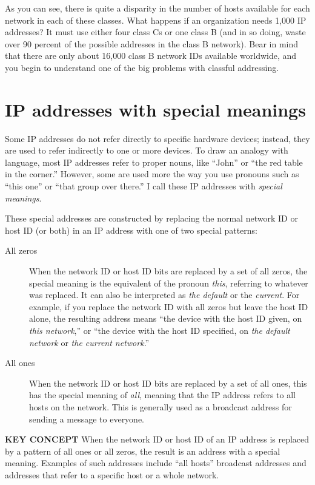As you can see, there is quite a disparity in the number of hosts
available for each network in each of these classes. What happens if an
organization needs 1,000
\protect\hypertarget{ch17s03.htmlux5cux23idx-CHP-17-0695}{}{}IP
addresses? It must use either four class Cs or one class B (and in so
doing, waste over 90 percent of the possible addresses in the class B
network). Bear in mind that there are only about 16,000 class B network
IDs available worldwide, and you begin to understand one of the big
problems with classful addressing.


\section{IP addresses with special meanings}

Some IP addresses do not refer directly to specific hardware devices; instead, they are used to refer indirectly to one or more devices.
To draw an analogy with language, most IP addresses refer to proper nouns, like ``John'' or ``the red table in the corner.''
However, some are used more the way you use pronouns such as ``this one'' or ``that group over there.''
I call these IP addresses with \emph{special meanings}.

These special addresses are constructed by replacing the normal network ID or host ID (or both) in an IP address with one of two special patterns:

\begin{description}
   \item[All zeros]
      When the network ID or host ID bits are replaced by a set of all zeros, the special meaning is the equivalent of the pronoun \emph{this}, referring to whatever was replaced.
      It can also be interpreted as \emph{the default} or the \emph{current}.
      For example, if you replace the network ID with all zeros but leave the host ID alone, the resulting address means ``the device with the host ID given, on \emph{this network},'' or ``the device with the host ID specified, on \emph{the default network} or \emph{the current network}.''
   \item[All ones]
      When the network ID or host ID bits are replaced by a set of all ones, this has the special meaning of \emph{all}, meaning that the IP address refers to all hosts on the network.
      This is generally used as a broadcast address for sending a message to everyone.
\end{description}

{\textbf{KEY CONCEPT}} When the network ID or host ID of an IP address
is replaced by a pattern of all ones or all zeros, the result is an
address with a special meaning. Examples of such addresses include ``all hosts'' broadcast addresses and addresses that refer to a specific host or a whole network.

